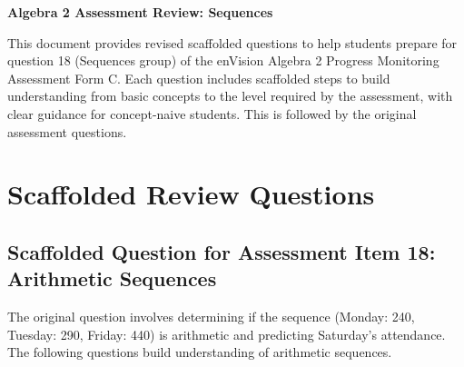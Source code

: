 \documentclass[12pt]{article}
\begin{document}
\begin{center}
    \textbf{Algebra 2 Assessment Review: Sequences}
\end{center}

This document provides revised scaffolded questions to help students prepare for question 18 (Sequences group) of the enVision Algebra 2 Progress Monitoring Assessment Form C. Each question includes scaffolded steps to build understanding from basic concepts to the level required by the assessment, with clear guidance for concept-naive students. This is followed by the original assessment questions.

\section*{Scaffolded Review Questions}

\subsection*{Scaffolded Question for Assessment Item 18: Arithmetic Sequences}
The original question involves determining if the sequence (Monday: 240, Tuesday: 290, Friday: 440) is arithmetic and predicting Saturday’s attendance. The following questions build understanding of arithmetic sequences.
\end{document}
